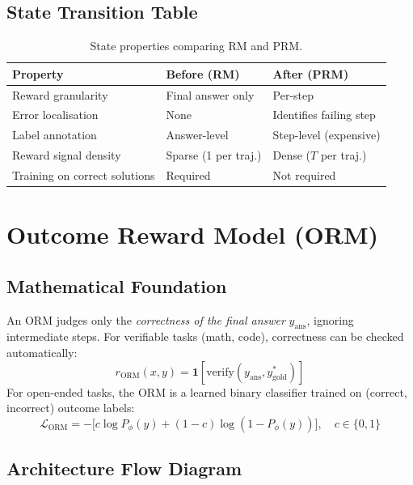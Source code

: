 \documentclass{article}
\begin{document}
\subsection{State Transition Table}
\begin{table}[h]\centering
\begin{tabular}{lll}\toprule
\textbf{Property} & \textbf{Before (RM)} & \textbf{After (PRM)}\\\midrule
Reward granularity & Final answer only & Per-step\\
Error localisation & None & Identifies failing step\\
Label annotation & Answer-level & Step-level (expensive)\\
Reward signal density & Sparse (1 per traj.) & Dense ($T$ per traj.)\\
Training on correct solutions & Required & Not required\\\bottomrule
\end{tabular}
\caption{State properties comparing RM and PRM.}
\end{table}

\newpage
\section{Outcome Reward Model (ORM)}

\subsection{Mathematical Foundation}
An ORM judges only the \emph{correctness of the final answer} $y_{\text{ans}}$, ignoring intermediate steps. For verifiable tasks (math, code), correctness can be checked automatically:
\begin{equation}
  r_{\text{ORM}}(x, y) = \mathbf{1}[\text{verify}(y_{\text{ans}}, y^*_{\text{gold}})]
\end{equation}
For open-ended tasks, the ORM is a learned binary classifier trained on (correct, incorrect) outcome labels:
\begin{equation}
  \mathcal{L}_{\text{ORM}} = -\bigl[c\log P_\phi(y) + (1-c)\log(1-P_\phi(y))\bigr],\quad c \in \{0,1\}
\end{equation}

\subsection{Architecture Flow Diagram}
\end{document}
